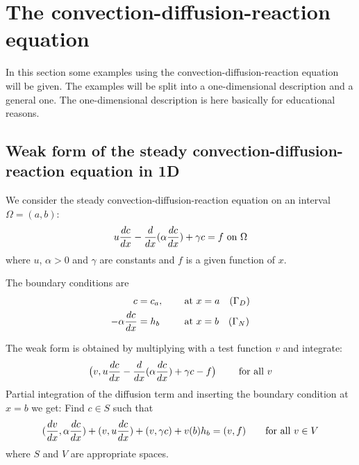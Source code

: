
\def\headdate{4th July 2023}

\section{The convection-diffusion-reaction equation}

In this section some examples using the convection-diffusion-reaction
equation will be given. The examples will be split into a one-dimensional
description and a general one. The one-dimensional description is here
basically for educational reasons.

\subsection{Weak form of the steady convection-diffusion-reaction equation
 in 1D}
\label{sec:weakform1dconvdiff}

We consider the steady convection-diffusion-reaction equation on an interval
$\Omega=(a,b)$:
\begin{equation}
   u \dfrac{d c}{d x} - \dfrac{d }{d x}(\alpha\dfrac{d c}{d x}) + \gamma c = f\text{ on }\Omega
\end{equation}
where $u$, $\alpha>0$ and $\gamma$ are constants and $f$ is a given function of
$x$.

The boundary conditions are
\begin{alignat*}{2}
   c&=c_a,\quad&&\text{ at }x=a\quad(\Gamma_D) \\
   -\alpha\dfrac{d c}{d x}&=h_b \quad&&\text{ at }x=b\quad(\Gamma_N)
\end{alignat*}

The weak form is obtained by multiplying with a test function $v$ and
integrate:
\begin{equation}
   \big(v,u \dfrac{d c}{d x} - \dfrac{d }{d x}(\alpha\dfrac{d c}{d x}) + \gamma c - f\big)\qquad
  \text{ for all }v
\label{eq:weak1}
\end{equation}
Partial integration of the diffusion term and inserting the boundary condition
at $x=b$ we get:
Find $c\in S$ such that
\begin{equation}
   (\dfrac{d v}{d x},\alpha\dfrac{d c}{d x})+(v,u\dfrac{d c}{d x})+(v,\gamma c)
        +v(b)h_b=(v,f)\qquad \text{for all }v\in V
\end{equation}
where $S$ and $V$ are appropriate spaces.

